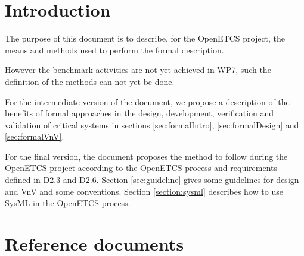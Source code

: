\section{Introduction}
\label{sec:intro}

The purpose of this document is to describe, for the OpenETCS project, the means and methods used to perform the formal description.

However the benchmark activities are not yet achieved in WP7, such the definition of the methods can not yet be done.

For the intermediate version of the document, we propose a description of the benefits of formal approaches in the design, development, verification and validation of critical systems in sections \ref{sec:formalIntro}, \ref{sec:formalDesign} and \ref{sec:formalVnV}.

For the final version, the document proposes the method to  follow during the OpenETCS project according to  the OpenETCS process  and requirements defined in D2.3  and D2.6.
Section \ref{sec:guideline} gives some guidelines for design and VnV and some conventions. Section \ref{section:sysml} describes how to  use SysML in the OpenETCS process.

\section{Reference documents}
\label{sec:ref}

